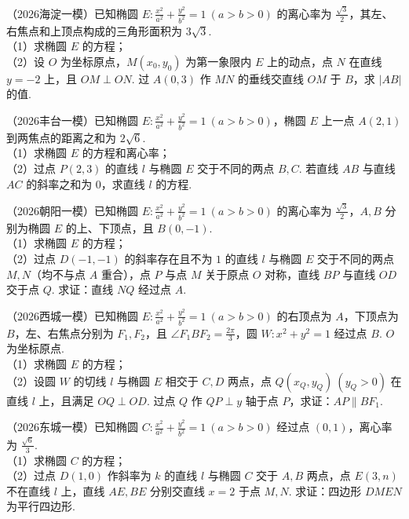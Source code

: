 \begin{example}  %
（2026海淀一模）已知椭圆 $E:\frac{x^2}{a^2}+\frac{y^2}{b^2}=1\ (a>b>0)$ 的离心率为 $\frac{\sqrt{3}}{2}$，其左、右焦点和上顶点构成的三角形面积为 $3\sqrt{3}$.\\
（1）求椭圆 $E$ 的方程；\\
（2）设 $O$ 为坐标原点，$M(x_0,y_0)$ 为第一象限内 $E$ 上的动点，点 $N$ 在直线 $y=-2$ 上，且 $OM\perp ON$. 过 $A(0,3)$ 作 $MN$ 的垂线交直线 $OM$ 于 $B$，求 $\lvert AB\rvert$ 的值.
\end{example}

\begin{example} %
（2026丰台一模）已知椭圆 $E:\frac{x^2}{a^2}+\frac{y^2}{b^2}=1\ (a>b>0)$，椭圆 $E$ 上一点 $A(2,1)$ 到两焦点的距离之和为 $2\sqrt{6}$.\\
（1）求椭圆 $E$ 的方程和离心率；\\
（2）过点 $P(2,3)$ 的直线 $l$ 与椭圆 $E$ 交于不同的两点 $B,C$. 若直线 $AB$ 与直线 $AC$ 的斜率之和为 $0$，求直线 $l$ 的方程.
\end{example}

\begin{example} %
（2026朝阳一模）已知椭圆 $E:\frac{x^2}{a^2}+\frac{y^2}{b^2}=1\ (a>b>0)$ 的离心率为 $\frac{\sqrt{3}}{2}$，$A,B$ 分别为椭圆 $E$ 的上、下顶点，且 $B(0,-1)$.\\
（1）求椭圆 $E$ 的方程；\\
（2）过点 $D(-1,-1)$ 的斜率存在且不为 $1$ 的直线 $l$ 与椭圆 $E$ 交于不同的两点 $M,N$（均不与点 $A$ 重合），点 $P$ 与点 $M$ 关于原点 $O$ 对称，直线 $BP$ 与直线 $OD$ 交于点 $Q$. 求证：直线 $NQ$ 经过点 $A$.
\end{example}

\begin{example} %
（2026西城一模）已知椭圆 $E:\frac{x^2}{a^2}+\frac{y^2}{b^2}=1\ (a>b>0)$ 的右顶点为 $A$，下顶点为 $B$，左、右焦点分别为 $F_1,F_2$，且 $\angle F_1BF_2=\frac{2\pi}{3}$，圆 $W:x^2+y^2=1$ 经过点 $B$. $O$ 为坐标原点.\\
（1）求椭圆 $E$ 的方程；\\
（2）设圆 $W$ 的切线 $l$ 与椭圆 $E$ 相交于 $C,D$ 两点，点 $Q(x_Q,y_Q)\ (y_Q>0)$ 在直线 $l$ 上，且满足 $OQ\perp OD$. 过点 $Q$ 作 $QP\perp y$ 轴于点 $P$，求证：$AP\parallel BF_1$.
\end{example}
\begin{example} %
（2026东城一模）已知椭圆 $C:\frac{x^2}{a^2}+\frac{y^2}{b^2}=1\ (a>b>0)$ 经过点 $(0,1)$，离心率为 $\frac{\sqrt{6}}{3}$.\\
（1）求椭圆 $C$ 的方程；\\
（2）过点 $D(1,0)$ 作斜率为 $k$ 的直线 $l$ 与椭圆 $C$ 交于 $A,B$ 两点，点 $E(3,n)$ 不在直线 $l$ 上，直线 $AE,BE$ 分别交直线 $x=2$ 于点 $M,N$. 求证：四边形 $DMEN$ 为平行四边形.
\end{example}

